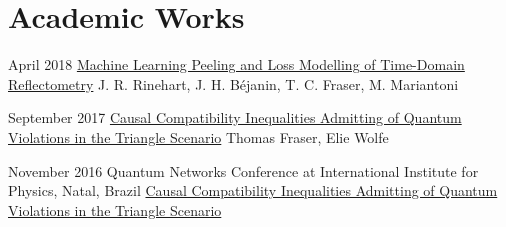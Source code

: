 \documentclass{article}
\begin{document}
    \section{Academic Works}
        {
            \begin{paperlist}
                \item{April 2018}
                {\href{https://arxiv.org/abs/1804.04756}{Machine Learning Peeling and Loss Modelling of Time-Domain Reflectometry}}
                {J. R. Rinehart, J. H. Béjanin, T. C. Fraser, M. Mariantoni}
                {}
                \item{September 2017}
                {\href{https://arxiv.org/abs/1709.06242}{Causal Compatibility Inequalities Admitting of Quantum Violations in the Triangle Scenario}}
                {Thomas Fraser, Elie Wolfe}
                {}
            \end{paperlist}
        }
        {
            \begin{academiclist}
                \item{November 2016}
                {Quantum Networks Conference at International Institute for Physics, Natal, Brazil}
                {\href{https://github.com/tcfraser/tcfraser.github.io/raw/master/documents/quantum_networks_brazil_2016.pdf}{Causal Compatibility Inequalities Admitting of Quantum Violations in the Triangle Scenario}}
            \end{academiclist}
        }
\end{document}
